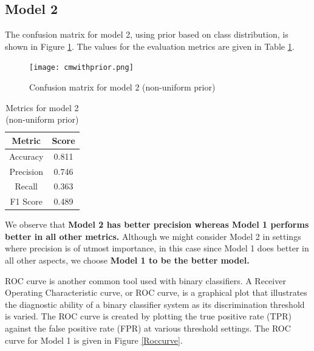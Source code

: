 \documentclass[conference]{IEEEtran}
\begin{document}
\subsection{Model 2}

The confusion matrix for model 2, using prior based on class distribution, is shown in Figure \ref{cmwithprior}. The values for the evaluation metrics are given in Table \ref{prior_metric_table}.

\begin{figure}[tbh]
\centering
\texttt{[image: cmwithprior.png]}
\caption{Confusion matrix for model 2 (non-uniform prior)}
\label{cmwithprior}
\end{figure}

\begin{table}
\begin{center}

\caption{Metrics for model 2 (non-uniform prior)}

\begin{tabular}{| c| c| }
 \hline
 Metric & Score \\
 \hline
 \hline
 Accuracy & 0.811 \\ 
 \hline
 Precision & 0.746 \\   
 \hline
 Recall &  0.363 \\
 \hline
 F1 Score & 0.489 \\
 \hline

\end{tabular}

\label{prior_metric_table}
\end{center}

\end{table}

We observe that \textbf{Model 2 has better precision whereas Model 1 performs better in all other metrics.} Although we might consider Model 2 in settings where precision is of utmost importance, in this case since Model 1 does better in all other aspects, we choose \textbf{Model 1 to be the better model.}

ROC curve is another common tool used with binary classifiers. A Receiver Operating Characteristic curve, or ROC curve, is a graphical plot that illustrates the diagnostic ability of a binary classifier system as its discrimination threshold is varied. The ROC curve is created by plotting the true positive rate (TPR) against the false positive rate (FPR) at various threshold settings. The ROC curve for Model 1 is given in Figure \ref{Roccurve}.
\end{document}
